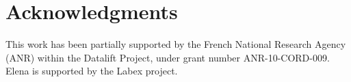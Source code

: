 \documentclass[runningheads,a4paper]{llncs}
\begin{document}

\section*{Acknowledgments} \label{sec:acknowledgments}
This work has been partially supported by the French National Research Agency (ANR) within the Datalift Project, under grant number ANR-10-CORD-009. Elena is supported by the Labex project.



\nocite{*}

\end{document}

